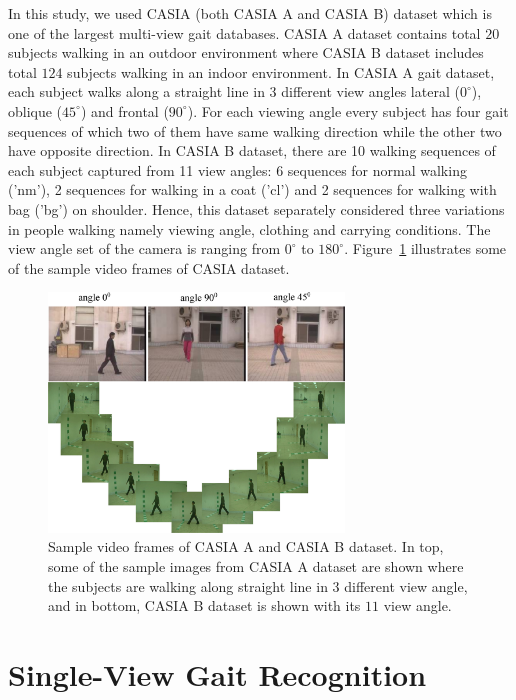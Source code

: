 In this study, we used CASIA (both CASIA A and CASIA B) dataset which is one of the largest multi-view gait databases. CASIA A dataset contains total $ 20 $ subjects walking in an outdoor environment where CASIA B dataset includes total $ 124 $ subjects walking in an indoor environment. In CASIA A gait dataset, each subject walks along a straight line in 3 different view angles lateral (${0^{\circ}}$), oblique (${45^{\circ}}$) and frontal (${90^{\circ}}$). For each viewing angle every subject has four gait sequences of which two of them have same walking direction while the other two have opposite direction. In CASIA B dataset, there are 10 walking sequences of each subject captured from 11 view angles: 6 sequences for normal walking ('nm'), 2 sequences for walking in a coat ('cl') and 2 sequences for walking with bag ('bg') on shoulder. Hence, this dataset separately considered three variations in people walking namely viewing angle, clothing and carrying conditions. The view angle set of the camera is ranging from ${0^{\circ}}$ to ${180^{\circ}}$. Figure~\ref{fig:casia_dataset} illustrates some of the sample video frames of CASIA dataset.


\begin{figure}
	\centering
	\includegraphics[width = 0.7\textwidth]{figures/casia_dataset.eps}
	\caption [Sample video frames of CASIA A and CASIA B dataset]
	{Sample video frames of CASIA A and CASIA B dataset. In top, some of the sample images from CASIA A dataset are shown where the subjects are walking along straight line in $ 3 $ different view angle, and in bottom, CASIA B dataset is shown with its $ 11 $ view angle.
	}
	\label{fig:casia_dataset}
\end{figure}


\section{Single-View Gait Recognition}
